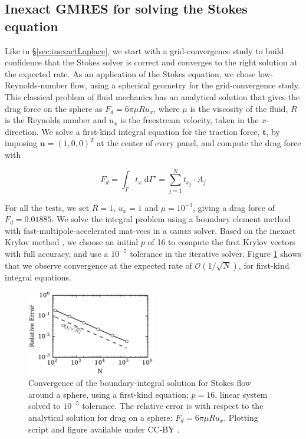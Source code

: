 \documentclass[final,3p,times]{elsarticle}
\renewcommand{\O}[1]{\mathcal{O}(#1)}
\newcommand{\gmres}{\textsc{gmres}\xspace}
\newcommand{\di}[1]{\text{d}#1}
\newcommand{\vect}[1]{\mathbf{#1}}
\begin{document}
\subsection{Inexact {\small GMRES} for solving the Stokes equation}
Like in \S\ref{sec:inexactLaplace}, we start with a grid-convergence study to build confidence that the Stokes solver is correct and converges to the right solution at the expected rate. As an application of the Stokes equation, we chose low-Reynolds-number flow, using a spherical geometry for the grid-convergence study. This classical problem of fluid mechanics has an analytical solution that gives the drag force on the sphere as $F_d = 6\pi\mu Ru_x$, where $\mu$ is the viscosity of the fluid, $R$ is the Reynolds number and $u_x$ is the freestream velocity, taken in the $x$-direction. We solve a first-kind integral equation for the traction force, $\vect{t}$, by imposing $\vect{u} = (1,0,0)^{T}$ at the center of every panel, and compute the drag force with

\begin{equation}
	\label{eqn:stokes_traction_drag}
	F_d = \int_\Gamma t_x\;\di{\Gamma'} = \sum_{j=1}^{N} t_{x_j}\cdot A_j
\end{equation}

For all the tests, we set $R=1$, $u_x = 1$ and $\mu = 10^{-3}$, giving a drag force of $F_d = 0.01885$. We solve the integral problem using a boundary element method with fast-multipole-accelerated mat-vecs in a \gmres solver. Based on the inexact Krylov method \cite{bouras2000relaxation,bourasfraysse2005}, we choose an initial $p$ of 16 to compute the first Krylov vectors with full accuracy, and use a $10^{-5}$ tolerance in the iterative solver.
Figure \ref{fig:stokes_convergence} shows that we observe convergence at the expected rate of $\O{1 / \sqrt{N}}$, for first-kind integral equations.

\begin{figure}%
\begin{center}
	\includegraphics[natwidth=3in,natheight=2in,width=0.5\textwidth]{StokesConvergence.pdf}
	\caption{Convergence of the boundary-integral solution for Stokes flow around a sphere, using a  first-kind equation; $p=16$, linear system solved to $10^{-5}$ tolerance. The relative error is with respect to the analytical solution for drag on a sphere: $F_d = 6\pi\mu Ru_x$. Plotting script and figure available under CC-BY \cite{WangLaytonBarba2016-figshare3}.}
	\label{fig:stokes_convergence}
\end{center}
\end{figure}
\end{document}
